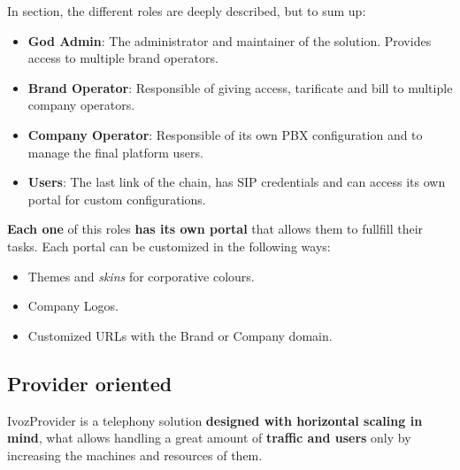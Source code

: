 \documentclass[letterpaper,10pt,english]{sphinxmanual}
\begin{document}
\noindent{}

In {\hyperref[operation_roles/index:operation\string-roles]{}} section, the different roles are deeply
described, but to sum up:
\begin{itemize}
\item {} 
\textbf{God Admin}: The administrator and maintainer of the solution. Provides
access to multiple brand operators.

\item {} 
\textbf{Brand Operator}: Responsible of giving access, tarificate and bill to
multiple company operators.

\item {} 
\textbf{Company Operator}: Responsible of its own PBX configuration and to
manage the final platform users.

\item {} 
\textbf{Users}: The last link of the chain, has SIP credentials and can access
its own portal for custom configurations.

\end{itemize}

\textbf{Each one} of this roles \textbf{has its own portal} that allows them to
fullfill their tasks. Each portal can be customized in the following
ways:
\begin{itemize}
\item {} 
Themes and \emph{skins} for corporative colours.

\item {} 
Company Logos.

\item {} 
Customized URLs with the Brand or Company domain.

\end{itemize}


\subsection{Provider oriented}
\label{intro/what_is_ivozprovider:operator-oriented}\label{intro/what_is_ivozprovider:provider-oriented}
IvozProvider is a telephony solution \textbf{designed with horizontal scaling
in mind}, what allows handling a great amount of \textbf{traffic and users}
only by increasing the machines and resources of them.
\end{document}
